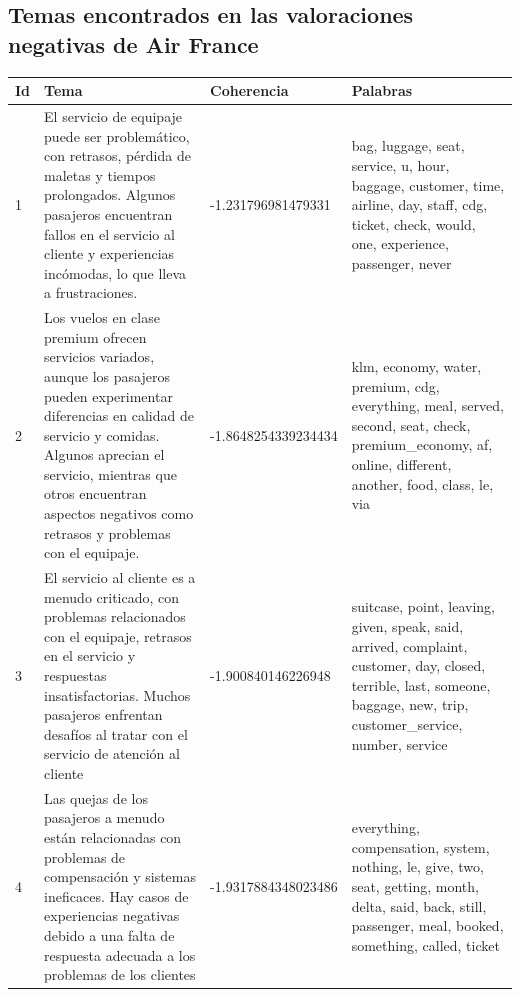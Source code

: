 \documentclass{report}
\begin{document}
{{\begin{longtable}{|c|c|c|c|}
                \end{longtable}   
            \clearpage\subsection{Temas encontrados en las valoraciones negativas de Air France}
                \label{tab:temas_air_france_negativas}
                \begin{longtable}{|p{1cm}|p{4cm}|p{4cm}|p{6cm}|}
                    \hline
                    \textbf{Id} & \textbf{Tema} & \textbf{Coherencia} & \textbf{Palabras} \\
                    \hline
                    1 & El servicio de equipaje puede ser problemático, con retrasos, pérdida de maletas y tiempos prolongados. Algunos pasajeros encuentran fallos en el servicio al cliente y experiencias incómodas, lo que lleva a frustraciones. & -1.231796981479331 & bag, luggage, seat, service, u, hour, baggage, customer, time, airline, day, staff, cdg, ticket, check, would, one, experience, passenger, never \\
                    \hline
                    2 & Los vuelos en clase premium ofrecen servicios variados, aunque los pasajeros pueden experimentar diferencias en calidad de servicio y comidas. Algunos aprecian el servicio, mientras que otros encuentran aspectos negativos como retrasos y problemas con el equipaje. & -1.8648254339234434 & klm, economy, water, premium, cdg, everything, meal, served, second, seat, check, premium\_economy, af, online, different, another, food, class, le, via \\
                    \hline
                    3 & El servicio al cliente es a menudo criticado, con problemas relacionados con el equipaje, retrasos en el servicio y respuestas insatisfactorias. Muchos pasajeros enfrentan desafíos al tratar con el servicio de atención al cliente & -1.900840146226948 & suitcase, point, leaving, given, speak, said, arrived, complaint, customer, day, closed, terrible, last, someone, baggage, new, trip, customer\_service, number, service \\
                    \hline
                    4 & Las quejas de los pasajeros a menudo están relacionadas con problemas de compensación y sistemas ineficaces. Hay casos de experiencias negativas debido a una falta de respuesta adecuada a los problemas de los clientes & -1.9317884348023486 & everything, compensation, system, nothing, le, give, two, seat, getting, month, delta, said, back, still, passenger, meal, booked, something, called, ticket \\

\end{longtable}}}
\end{document}
